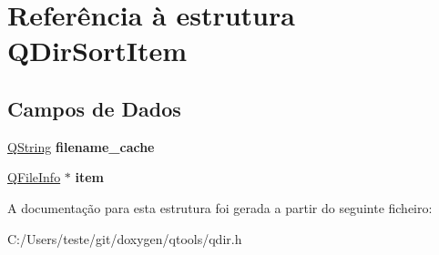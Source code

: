 \hypertarget{struct_q_dir_sort_item}{\section{Referência à estrutura Q\-Dir\-Sort\-Item}
\label{struct_q_dir_sort_item}
}
\subsection*{Campos de Dados}
\begin{DoxyCompactItemize}
\item 
\hypertarget{struct_q_dir_sort_item_ab22a291b2c4e4c9862fce915548863d6}{\hyperlink{class_q_string}{Q\-String} {\bfseries filename\-\_\-cache}}\label{struct_q_dir_sort_item_ab22a291b2c4e4c9862fce915548863d6}

\item 
\hypertarget{struct_q_dir_sort_item_aee4ecc9925981169378790d047c318b9}{\hyperlink{class_q_file_info}{Q\-File\-Info} $\ast$ {\bfseries item}}\label{struct_q_dir_sort_item_aee4ecc9925981169378790d047c318b9}

\end{DoxyCompactItemize}


A documentação para esta estrutura foi gerada a partir do seguinte ficheiro\-:\begin{DoxyCompactItemize}
\item 
C\-:/\-Users/teste/git/doxygen/qtools/qdir.\-h\end{DoxyCompactItemize}
